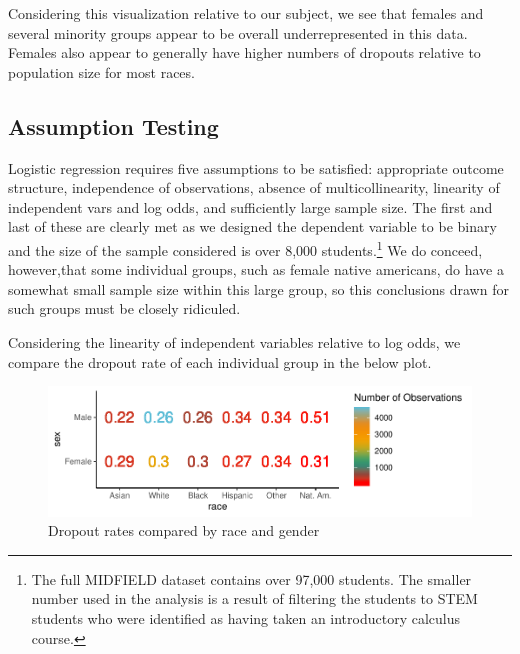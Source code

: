\documentclass[]{article}
\begin{document}
Considering this visualization relative to our subject, we see that
females and several minority groups appear to be overall
underrepresented in this data. Females also appear to generally have
higher numbers of dropouts relative to population size for most races.

\subsection{Assumption Testing}\label{assumption-testing}

Logistic regression requires five assumptions to be satisfied:
appropriate outcome structure, independence of observations, absence of
multicollinearity, linearity of independent vars and log odds, and
sufficiently large sample size. \cite{glmassumptions} The first and last
of these are clearly met as we designed the dependent variable to be
binary and the size of the sample considered is over 8,000
students.\footnote{The full MIDFIELD dataset contains over 97,000 students. The smaller number used in the analysis is a result of filtering the students to STEM students who were identified as having taken an introductory calculus course.}
We do conceed, however,that some individual groups, such as female
native americans, do have a somewhat small sample size within this large
group, so this conclusions drawn for such groups must be closely
ridiculed.

Considering the linearity of independent variables relative to log odds,
we compare the dropout rate of each individual group in the below plot.

\begin{figure}
\centering
\includegraphics{Stat_461_Final_Project_Report_files/figure-latex/secondplot-1.pdf}
\caption{Dropout rates compared by race and gender}
\end{figure}
\end{document}
